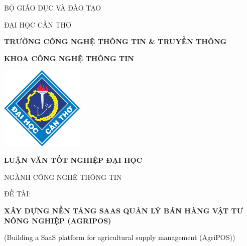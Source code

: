 \documentclass[13pt, a4paper]{report}
\begin{document}
\clearpage
\begin{titlepage}
    \thispagestyle{empty}
    
    \centering
    {\fontsize{13}{15}\selectfont BỘ GIÁO DỤC VÀ ĐÀO TẠO\par}
    {\fontsize{13}{15}\selectfont ĐẠI HỌC CẦN THƠ\par}
    \vspace{0.2cm}
    {\fontsize{14}{16}\bfseries TRƯỜNG CÔNG NGHỆ THÔNG TIN \& TRUYỀN THÔNG\par}
    {\fontsize{14}{16}\bfseries KHOA CÔNG NGHỆ THÔNG TIN\par}
    
    \vfill %
    
    \includegraphics[width=4cm]{ctu.png}
    
    \vfill %
    
    {\fontsize{14}{16}\bfseries LUẬN VĂN TỐT NGHIỆP ĐẠI HỌC\par}
    \vspace{0.5cm}
    {\fontsize{13}{15}\selectfont NGÀNH CÔNG NGHỆ THÔNG TIN\par}
    
    \vspace{1cm}
    {\fontsize{13}{15}\selectfont ĐỀ TÀI:\par}
    \vspace{0.5cm}
    {\fontsize{18}{22}\bfseries\MakeUppercase{Xây dựng nền tảng SaaS quản lý bán hàng vật tư nông nghiệp (AgriPOS)}\par}
    \vspace{0.5cm}
    {\fontsize{13}{15}\selectfont (Building a SaaS platform for agricultural supply management (AgriPOS))\par}
    

\end{titlepage}
\end{document}
